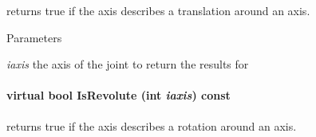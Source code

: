 returns true if the axis describes a translation around an axis. 


\begin{DoxyParams}{Parameters}
\item[{\em iaxis}]the axis of the joint to return the results for \end{DoxyParams}
\hypertarget{classOpenRAVE_1_1KinBody_1_1Joint_a477d385f39817d9116efac236d56b54f}{
\paragraph[{IsRevolute}]{\setlength{\rightskip}{0pt plus 5cm}virtual bool IsRevolute (int {\em iaxis}) const}\hfill}
\label{classOpenRAVE_1_1KinBody_1_1Joint_a477d385f39817d9116efac236d56b54f}


returns true if the axis describes a rotation around an axis. 


